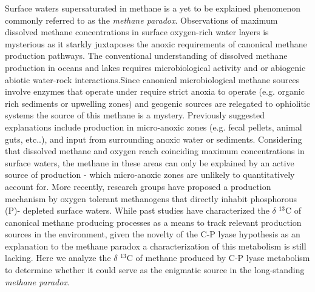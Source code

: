 \documentclass{nature}
\begin{document}
Surface waters supersaturated in methane is a yet to be explained phenomenon commonly referred to as the \textit{methane paradox}.  Observations of maximum dissolved methane concentrations in surface oxygen-rich water layers is mysterious as it starkly juxtaposes the anoxic requirements of canonical methane production pathways. The conventional understanding of dissolved methane production in oceans and lakes requires microbiological activity and or abiogenic abiotic water-rock interactions.Since canonical microbiological methane sources involve enzymes that operate under require strict anoxia to operate (e.g. organic rich sediments or upwelling zones) and geogenic sources are relegated to ophiolitic systems the source of this methane is a mystery. Previously suggested explanations include production in micro-anoxic zones (e.g. fecal pellets, animal guts, etc..), and input from surrounding anoxic water or sediments. Considering that dissolved methane and oxygen reach coinciding maximum concentrations in surface waters, the methane in these areas can only be explained by an active source of production - which micro-anoxic zones are unlikely to quantitatively account for.  More recently, research groups have proposed a production mechanism by oxygen tolerant methanogens that directly inhabit phosphorous (P)- depleted surface waters. While past studies have characterized the $\delta$ $^13$C of canonical methane producing processes as a means to track relevant production sources in the environment, given the novelty of the C-P lyase hypothesis as an explanation to the methane paradox a characterization of this metabolism is still lacking. Here we analyze the $\delta$ $^13$C of methane produced by C-P lyase metabolism to determine whether it could serve as the enigmatic source in the long-standing \textit{methane paradox}. 
\end{document}
